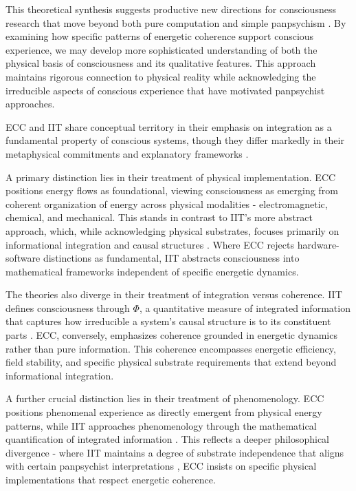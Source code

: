 \begin{refsection}
This theoretical synthesis suggests productive new directions for consciousness research that move beyond both pure computation and simple panpsychism \cite{Koch2019}. By examining how specific patterns of energetic coherence support conscious experience, we may develop more sophisticated understanding of both the physical basis of consciousness and its qualitative features. This approach maintains rigorous connection to physical reality while acknowledging the irreducible aspects of conscious experience that have motivated panpsychist approaches.

ECC and IIT share conceptual territory in their emphasis on integration as a fundamental property of conscious systems, though they differ markedly in their metaphysical commitments and explanatory frameworks \cite{Tononi2008}. 

A primary distinction lies in their treatment of physical implementation. ECC positions energy flows as foundational, viewing consciousness as emerging from coherent organization of energy across physical modalities - electromagnetic, chemical, and mechanical. This stands in contrast to IIT's more abstract approach, which, while acknowledging physical substrates, focuses primarily on informational integration and causal structures \cite{Tononi2016}. Where ECC rejects hardware-software distinctions as fundamental, IIT abstracts consciousness into mathematical frameworks independent of specific energetic dynamics.

The theories also diverge in their treatment of integration versus coherence. IIT defines consciousness through $\Phi$, a quantitative measure of integrated information that captures how irreducible a system's causal structure is to its constituent parts \cite{Oizumi2014}. ECC, conversely, emphasizes coherence grounded in energetic dynamics rather than pure information. This coherence encompasses energetic efficiency, field stability, and specific physical substrate requirements that extend beyond informational integration.

A further crucial distinction lies in their treatment of phenomenology. ECC positions phenomenal experience as directly emergent from physical energy patterns, while IIT approaches phenomenology through the mathematical quantification of integrated information \cite{Tononi2015}. This reflects a deeper philosophical divergence - where IIT maintains a degree of substrate independence that aligns with certain panpsychist interpretations \cite{Koch2019}, ECC insists on specific physical implementations that respect energetic coherence.


\end{refsection}
